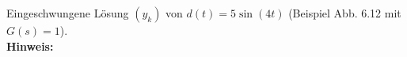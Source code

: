 \begin{question}[section=6,name={Eingeschwungene Lösung 2},difficulty=,type=mdl,tags={}]
	Eingeschwungene Lösung $(y_k)$ von $d(t) = 5 \sin(4t)$ (Beispiel Abb. 6.12 mit $G(s) = 1$).
	\\ \textbf{Hinweis:}\\
	
\end{question}
\begin{solution}
	
\end{solution}